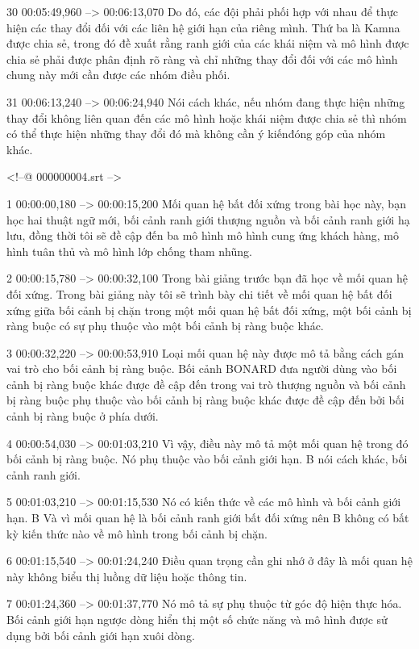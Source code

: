 30
00:05:49,960 --> 00:06:13,070
Do đó, các đội phải phối hợp với nhau để thực hiện các thay đổi đối với các liên hệ giới hạn của riêng mình.  Thứ ba là Kamna được chia sẻ, trong đó đề xuất rằng ranh giới của các khái niệm và mô hình được chia sẻ phải được phân định rõ ràng và chỉ những thay đổi đối với các mô hình chung này mới cần được các nhóm điều phối.

31
00:06:13,240 --> 00:06:24,940
Nói cách khác, nếu nhóm đang thực hiện những thay đổi không liên quan đến các mô hình hoặc khái niệm được chia sẻ thì nhóm có thể thực hiện những thay đổi đó mà không cần ý kiến ​​đóng góp của nhóm khác.

<!--@ 000000004.srt -->

1
00:00:00,180 --> 00:00:15,200
Mối quan hệ bất đối xứng trong bài học này, bạn học hai thuật ngữ mới, bối cảnh ranh giới thượng nguồn và bối cảnh ranh giới hạ lưu, đồng thời tôi sẽ đề cập đến ba mô hình mô hình cung ứng khách hàng, mô hình tuân thủ và mô hình lớp chống tham nhũng.

2
00:00:15,780 --> 00:00:32,100
Trong bài giảng trước bạn đã học về mối quan hệ đối xứng.  Trong bài giảng này tôi sẽ trình bày chi tiết về mối quan hệ bất đối xứng giữa bối cảnh bị chặn trong một mối quan hệ bất đối xứng, một bối cảnh bị ràng buộc có sự phụ thuộc vào một bối cảnh bị ràng buộc khác.

3
00:00:32,220 --> 00:00:53,910
Loại mối quan hệ này được mô tả bằng cách gán vai trò cho bối cảnh bị ràng buộc.  Bối cảnh BONARD đưa người dùng vào bối cảnh bị ràng buộc khác được đề cập đến trong vai trò thượng nguồn và bối cảnh bị ràng buộc phụ thuộc vào bối cảnh bị ràng buộc khác được đề cập đến bởi bối cảnh bị ràng buộc ở phía dưới.

4
00:00:54,030 --> 00:01:03,210
Vì vậy, điều này mô tả một mối quan hệ trong đó bối cảnh bị ràng buộc.  Nó phụ thuộc vào bối cảnh giới hạn.  B nói cách khác, bối cảnh ranh giới.

5
00:01:03,210 --> 00:01:15,530
Nó có kiến ​​thức về các mô hình và bối cảnh giới hạn.  B Và vì mối quan hệ là bối cảnh ranh giới bất đối xứng nên B không có bất kỳ kiến ​​thức nào về mô hình trong bối cảnh bị chặn.

6
00:01:15,540 --> 00:01:24,240
Điều quan trọng cần ghi nhớ ở đây là mối quan hệ này không biểu thị luồng dữ liệu hoặc thông tin.

7
00:01:24,360 --> 00:01:37,770
Nó mô tả sự phụ thuộc từ góc độ hiện thực hóa.  Bối cảnh giới hạn ngược dòng hiển thị một số chức năng và mô hình được sử dụng bởi bối cảnh giới hạn xuôi dòng.

